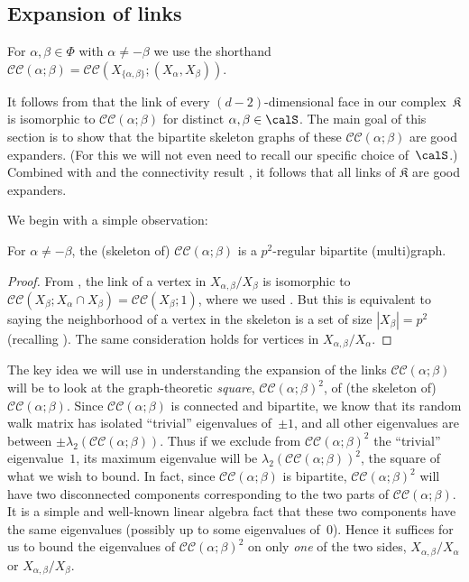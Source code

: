 \documentclass[11pt]{article}
\newcommand{\CC}[2]{\mathcal{C}\mathcal{C}(#1;#2)}
\newcommand{\complex}{\mathfrak{K}}
\begin{document}
\subsection{Expansion of links}\label{sec:explink}

\begin{definition}
    For $\alpha,\beta \in \Phi$ with $\alpha \neq -\beta$ we use the shorthand $\CC{\alpha}{\beta} = \CC{X_{\{\alpha,\beta\}} }{(X_\alpha,X_\beta)}$.
\end{definition}
It follows from  that the link of every $(d-2)$-dimensional face in our complex~$\complex$ is isomorphic to $\CC{\alpha}{\beta}$ for distinct $\alpha,\beta \in \calS$.  The main goal of this section is to show that the bipartite skeleton graphs of these $\CC{\alpha}{\beta}$ are good expanders.  (For this we will not even need to recall our specific choice of~$\calS$.) Combined with  and the connectivity result , it follows that all links of $\complex$ are good expanders.

We begin with a simple observation:
\begin{proposition}
    For $\alpha \neq -\beta$, the (skeleton of) $\CC{\alpha}{\beta}$ is a $p^2$-regular bipartite (multi)graph.
\end{proposition}
\begin{proof}
    From , the link of a vertex in $X_{\alpha,\beta}/X_\beta$ is isomorphic to $\CC{X_\beta}{X_\alpha \cap X_\beta} = \CC{X_\beta}{1}$, where we used .  
    But this is equivalent to saying the neighborhood of a vertex in the skeleton is a set of size $|X_\beta| = p^2$ (recalling ).  The same consideration holds for vertices in $X_{\alpha,\beta}/X_\alpha$.
\end{proof}

The key idea we will use in understanding the expansion of  the links $\CC{\alpha}{\beta}$ will be to look at the graph-theoretic \emph{square}, $\CC{\alpha}{\beta}^2$, of (the skeleton of) $\CC{\alpha}{\beta}$.  Since $\CC{\alpha}{\beta}$ is connected and bipartite, we know that its random walk matrix has isolated ``trivial'' eigenvalues of~$\pm 1$, and all other eigenvalues are between $\pm \lambda_2(\CC{\alpha}{\beta})$.  Thus if we exclude from $\CC{\alpha}{\beta}^2$ the ``trivial'' eigenvalue~$1$, its maximum eigenvalue will be $\lambda_2(\CC{\alpha}{\beta})^2$, the square of what we wish to bound.  In fact, since $\CC{\alpha}{\beta}$ is bipartite, $\CC{\alpha}{\beta}^2$ will have two disconnected components corresponding to the two parts of $\CC{\alpha}{\beta}$.  It is a simple and well-known linear algebra fact that these two components have the same eigenvalues (possibly up to some eigenvalues of~$0$).
Hence it suffices for us to bound the eigenvalues of $\CC{\alpha}{\beta}^2$ on only \emph{one} of the two sides, $X_{\alpha,\beta}/X_\alpha$ or $X_{\alpha,\beta}/X_\beta$.  
\end{document}
